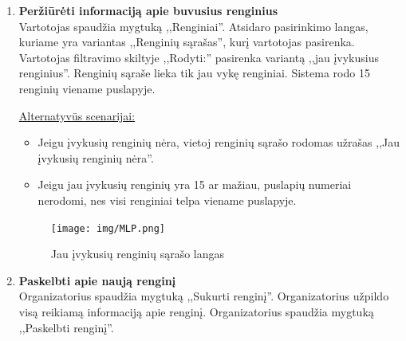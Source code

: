 \documentclass{VUMIFPSkursinis}
\begin{document}
\begin{enumerate} [label = \textbf{U\arabic*.}]
				\underline{Alternatyvūs scenarijai:}
				\begin{itemize}
					\item Jei renginiui neleidžiama rašyti atsiliepimo, mygtuko ,,Rašyti atsiliepimą'' nėra.
					\item Jei vartotojas neužpildo visų atsiliepimo laukų, mygtukas ,,Siųsti'' yra neaktyvus.
					\item Jei įvyksta klaida užregistruojant vartotojo atsiliepimą, vartotojas apie tai informuojamas iššokančiame lange ir atsiliepimo forma išvaloma.
				\end{itemize}

				\begin{figure}[H]
					\centering
					\texttt{[image: img/MLP.png]}
					\caption{Atsiliepimo apie renginį langas}
					\label{fig:rasyti-atsiliepima-apie-rengini}
				\end{figure}
			\item \textbf{Peržiūrėti informaciją apie buvusius renginius} \\
				Vartotojas spaudžia mygtuką ,,Renginiai''.
				Atsidaro pasirinkimo langas, kuriame yra variantas ,,Renginių sąrašas'', kurį vartotojas pasirenka.
				Vartotojas filtravimo skiltyje ,,Rodyti:'' pasirenka variantą ,,jau įvykusius renginius''.
				Renginių sąraše lieka tik jau vykę renginiai.
				Sistema rodo 15 renginių viename puslapyje.

				\underline{Alternatyvūs scenarijai:}
				\begin{itemize}
					\item Jeigu įvykusių renginių nėra, vietoj renginių sąrašo rodomas užrašas ,,Jau įvykusių renginių nėra''.
					\item Jeigu jau įvykusių renginių yra 15 ar mažiau, puslapių numeriai nerodomi, nes visi renginiai telpa viename puslapyje.
				\end{itemize}

				\begin{figure}[H]
					\centering
					\texttt{[image: img/MLP.png]}
					\caption{Jau įvykusių renginių sąrašo langas}
					\label{fig:matyti-jau-ivykusius-renginius}
				\end{figure}
			
			\item \textbf{Paskelbti apie naują renginį} \\
				Organizatorius spaudžia mygtuką ,,Sukurti renginį''. 
				Organizatorius užpildo visą reikiamą informaciją apie renginį.
				Organizatorius spaudžia mygtuką ,,Paskelbti renginį''.
				

\end{enumerate}
\end{document}
